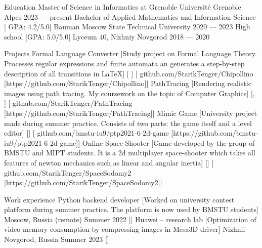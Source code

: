 \documentclass[
    compact
]{llresume}
\begin{document}
\makeheader

\begin{mainpane}
    \begin{mainsection}{Education}
		\entryJob
            {Master of Science in Informatics at Grenoble}
            {Université Grenoble Alpes}
            {2023 — present}
        \entryJob
            {Bachelor of Applied Mathematics and Information Science}
            [ GPA: 4.2/5.0]
            {Bauman Moscow State Technical University}
            {2020 — 2023}
        \entryJob
            {High school}
            [GPA: 5.0/5.0]
            {Lyceum 40, Nizhniy Novgorod}
            {2018 — 2020}
    \end{mainsection}


    \begin{mainsection}{Projects}
        \entryGeneric
            {Formal Language Converter}
            [Study project on Formal Language Theory. Processes regular expressions and finite automata an generates a step-by-step description of all transitions in LaTeX]
            [ ]
            [\infoGithub
                {github.com/StarikTenger/Chipollino}
                [https://github.com/StarikTenger/Chipollino]]
        \entryGeneric
            {PathTracing}
            [Rendering realistic images using path tracing. My coursework on the topic of Computer Graphics]
            [, ]
            [\infoGithub
                {github.com/StarikTenger/PathTracing}
                [https://github.com/StarikTenger/PathTracing]]
        \entryGeneric
            {Mimic Game}
            [University project made during summer practice. Consists of two parts: the game itself and a level editor]
            []
            [\infoGithub
                {github.com/bmstu-iu9/ptp2021-6-2d-game}
                [https://github.com/bmstu-iu9/ptp2021-6-2d-game]]
        \entryGeneric
            {Online Space Shooter}
            [Game developed by the group of BMSTU and MIPT students. It is a 2d multiplayer space-shooter which takes all features of newton mechanics such as linear and angular inertia]
            []
            [\infoGithub
                {github.com/StarikTenger/SpaceSodomy2}
                [https://github.com/StarikTenger/SpaceSodomy2]]
    \end{mainsection}

    \begin{mainsection}{Work experience}
        \entryJob
            {Python backend developer}
            [Worked on university contest platform during summer practice. The platform is now used by BMSTU students]
            {Moscow, Russia (remote)}
            {Summer 2022}
            []
		\entryJob
            {Huawei -- research lab}
            [Optimization of video memory consumption by compressing images in Mesa3D driver]
            {Nizhnii Novgorod, Russia}
            {Summer 2023}
            []
    \end{mainsection}


\end{mainpane}
\end{document}
